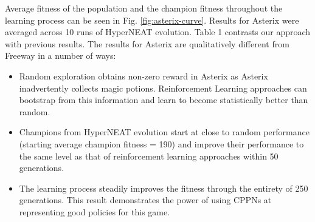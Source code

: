 \documentclass{acm_proc_article-sp}
\begin{document}
Average fitness of the population and the champion fitness throughout the learning process can be seen in Fig. \ref{fig:asterix-curve}. Results for Asterix were averaged across 10 runs of HyperNEAT evolution. Table 1 contrasts our approach with previous results. The results for Asterix are qualitatively different from Freeway in a number of ways:
\begin{itemize}
\item
Random exploration obtains non-zero reward in Asterix as Asterix inadvertently collects magic potions. Reinforcement Learning approaches can bootstrap from this information and learn to become statistically better than random.
\item
Champions from HyperNEAT evolution start at close to random performance (starting average champion fitness = 190) and improve their performance to the same level as that of reinforcement learning approaches within 50 generations. 
\item
The learning process steadily improves the fitness through the entirety of 250 generations. This result demonstrates the power of using CPPNs at representing good policies for this game.
\end{itemize}

\end{document}
